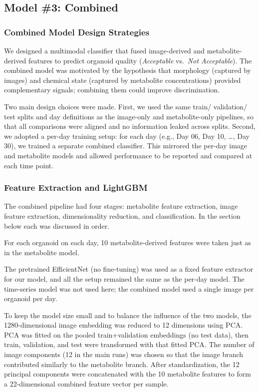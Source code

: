\documentclass{article}
\begin{document}
\subsection{Model \#3: Combined}
\subsubsection{Combined Model Design Strategies}

We designed a multimodal classifier that fused image-derived and metabolite-derived features to predict organoid quality (\textit{Acceptable} vs.\ \textit{Not Acceptable}). The combined model was motivated by the hypothesis that morphology (captured by images) and chemical state (captured by metabolite concentrations) provided complementary signals; combining them could improve discrimination. 

Two main design choices were made. First, we used the same train/ validation/ test splits and day definitions as the image-only and metabolite-only pipelines, so that all comparisons were aligned and no information leaked across splits. Second, we adopted a per-day training setup: for each day (e.g., Day 06, Day 10, \ldots, Day 30), we trained a separate combined classifier. This mirrored the per-day image and metabolite models and allowed performance to be reported and compared at each time point.

\subsubsection{Feature Extraction and LightGBM}


The combined pipeline had four stages: metabolite feature extraction, image feature extraction, dimensionality reduction, and classification. In the section below each was discussed in order.

For each organoid on each day, 10 metabolite-derived features were taken just as in the metabolite model.

The pretrained EfficientNet (no fine-tuning) was used as a fixed feature extractor for our model, and all the setup remained the same as the per-day model. The time-series model was not used here; the combined model used a single image per organoid per day.

To keep the model size small and to balance the influence of the two models, the 1280-dimensional image embedding was reduced to 12 dimensions using PCA. PCA was fitted on the pooled train+validation embeddings (no test data), then train, validation, and test were transformed with that fitted PCA. The number of image components (12 in the main runs) was chosen so that the image branch contributed similarly to the metabolite branch. After standardization, the 12 principal components were concatenated with the 10 metabolite features to form a 22-dimensional combined feature vector per sample.
\end{document}
